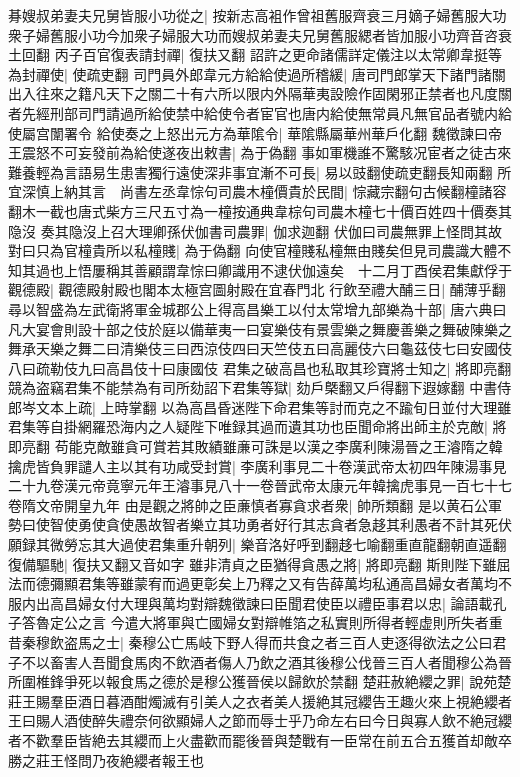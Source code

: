 朞嫂叔弟妻夫兄舅皆服小功從之|{
	按新志高袓作曾祖舊服齊衰三月嫡子婦舊服大功衆子婦舊服小功今加衆子婦服大功而嫂叔弟妻夫兄舅舊服緦者皆加服小功齊音咨衰土回翻}
丙子百官復表請封禪|{
	復扶又翻}
詔許之更命諸儒詳定儀注以太常卿韋挺等為封禪使|{
	使疏吏翻}
司門員外郎韋元方給給使過所稽緩|{
	唐司門郎掌天下諸門諸關出入往來之籍凡天下之關二十有六所以限内外隔華夷設險作固閑邪正禁者也凡度關者先經刑部司門請過所給使禁中給使令者宦官也唐内給使無常員凡無官品者號内給使屬宫闈署令}
給使奏之上怒出元方為華隂令|{
	華隂縣屬華州華戶化翻}
魏徵諫曰帝王震怒不可妄發前為給使遂夜出敕書|{
	為于偽翻}
事如軍機誰不驚駭况宦者之徒古來難養輕為言語易生患害獨行遠使深非事宜漸不可長|{
	易以豉翻使疏吏翻長知兩翻}
所宜深慎上納其言　尚書左丞韋悰句司農木橦價貴於民間|{
	悰藏宗翻句古候翻橦諸容翻木一截也唐式柴方三尺五寸為一橦按通典韋棕句司農木橦七十價百姓四十價奏其隐沒}
奏其隐沒上召大理卿孫伏伽書司農罪|{
	伽求迦翻}
伏伽曰司農無罪上怪問其故對曰只為官橦貴所以私橦賤|{
	為于偽翻}
向使官橦賤私橦無由賤矣但見司農識大體不知其過也上悟屢稱其善顧謂韋悰曰卿識用不逮伏伽遠矣　十二月丁酉侯君集獻俘于觀德殿|{
	觀德殿射殿也閣本太極宫圖射殿在宜春門北}
行飲至禮大酺三日|{
	酺薄乎翻}
尋以智盛為左武衛將軍金城郡公上得高昌樂工以付太常增九部樂為十部|{
	唐六典曰凡大宴會則設十部之伎於庭以備華夷一曰宴樂伎有景雲樂之舞慶善樂之舞破陳樂之舞承天樂之舞二曰清樂伎三曰西涼伎四曰天竺伎五曰高麗伎六曰龜茲伎七曰安國伎八曰疏勒伎九曰高昌伎十曰康國伎}
君集之破高昌也私取其珍寶將士知之|{
	將即亮翻}
競為盗竊君集不能禁為有司所劾詔下君集等獄|{
	劾戶槩翻又戶得翻下遐嫁翻}
中書侍郎岑文本上疏|{
	上時掌翻}
以為高昌昏迷陛下命君集等討而克之不踰旬日並付大理雖君集等自掛網羅恐海内之人疑陛下唯録其過而遺其功也臣聞命將出師主於克敵|{
	將即亮翻}
苟能克敵雖貪可賞若其敗績雖亷可誅是以漢之李廣利陳湯晉之王濬隋之韓擒虎皆負罪譴人主以其有功咸受封賞|{
	李廣利事見二十卷漢武帝太初四年陳湯事見二十九卷漢元帝竟寧元年王濬事見八十一卷晉武帝太康元年韓擒虎事見一百七十七卷隋文帝開皇九年}
由是觀之將帥之臣亷慎者寡貪求者衆|{
	帥所類翻}
是以黄石公軍勢曰使智使勇使貪使愚故智者樂立其功勇者好行其志貪者急趍其利愚者不計其死伏願録其微勞忘其大過使君集重升朝列|{
	樂音洛好呼到翻趍七喻翻重直龍翻朝直遥翻}
復備驅馳|{
	復扶又翻又音如字}
雖非清貞之臣猶得貪愚之將|{
	將即亮翻}
斯則陛下雖屈法而德彌顯君集等雖蒙宥而過更彰矣上乃釋之又有告薛萬均私通高昌婦女者萬均不服内出高昌婦女付大理與萬均對辯魏徵諫曰臣聞君使臣以禮臣事君以忠|{
	論語載孔子答魯定公之言}
今遣大將軍與亡國婦女對辯帷箔之私實則所得者輕虚則所失者重昔秦穆飲盗馬之士|{
	秦穆公亡馬岐下野人得而共食之者三百人吏逐得欲法之公曰君子不以畜害人吾聞食馬肉不飲酒者傷人乃飲之酒其後穆公伐晉三百人者聞穆公為晉所圍椎鋒爭死以報食馬之德於是穆公獲晉侯以歸飲於禁翻}
楚莊赦絶纓之罪|{
	說苑楚莊王賜羣臣酒日暮酒酣燭滅有引美人之衣者美人援絶其冠纓告王趣火來上視絶纓者王曰賜人酒使醉失禮奈何欲顯婦人之節而辱士乎乃命左右曰今日與寡人飲不絶冠纓者不歡羣臣皆絶去其纓而上火盡歡而罷後晉與楚戰有一臣常在前五合五獲首却敵卒勝之莊王怪問乃夜絶纓者報王也}
